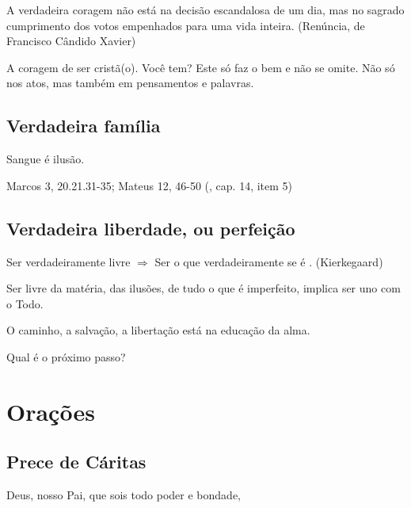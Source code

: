 \documentclass[12pt,a4paper]{article}
\begin{document}
			A verdadeira coragem n\~ao est\'a na decis\~ao escandalosa de um dia, mas no sagrado cumprimento dos votos empenhados para uma vida inteira. (Ren\'uncia\cite{x}, de Francisco C\^andido Xavier)

			A coragem de ser crist\~a(o). Voc\^e tem? Este s\'o faz o bem e n\~ao se omite. N\~ao s\'o nos atos, mas tamb\'em em pensamentos e palavras.

		\subsection{Verdadeira fam\'ilia}
			\begin{flushright}
			\end{flushright}

			Sangue \'e ilus\~ao.

			Marcos 3, 20.21.31-35; Mateus 12, 46-50 (\cite{ese}, cap. 14, item 5)

		\subsection{Verdadeira liberdade, ou perfei\c{c}\~ao\cite{x}}
			\begin{flushright}
			\end{flushright}

			Ser verdadeiramente livre $ \Rightarrow $ Ser o que verdadeiramente se \'e \cite{x}. (Kierkegaard) %

			Ser livre da mat\'eria\cite{x}, das ilus\~oes\cite{x}, de tudo o que \'e imperfeito, implica ser uno\cite{x} com o Todo.

			O caminho\cite{x}, a salva\c{c}\~ao, a liberta\c{c}\~ao est\'a na educa\c{c}\~ao da alma.

			Qual \'e o pr\'oximo passo?

	\section{Ora\c{c}\~oes}
			\begin{flushright}
			\end{flushright}

		\subsection{Prece de C\'aritas}
			\begin{flushright}
			\end{flushright}

			Deus, nosso Pai, que sois todo poder e bondade,
\end{document}
